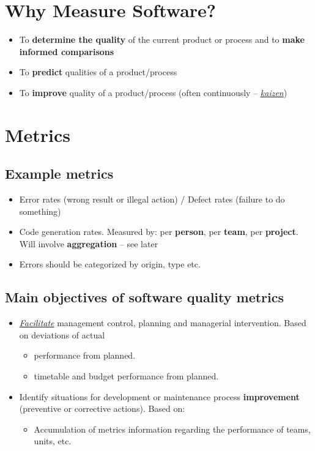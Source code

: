 \documentclass{article}
\newcommand{\worddef}[1]{\hyperref[sec:reference]{\textit{#1}}}
\begin{document}
\tableofcontents

\newpage

\section{Why Measure Software?}

\begin{itemize}
  \item To \textbf{determine the quality} of the current product or process and to \textbf{make informed comparisons}
  \item To \textbf{predict} qualities of a product/process
  \item To \textbf{improve} quality of a product/process (often continuously – \worddef{kaizen})
\end{itemize}

\section{Metrics}

\subsection{Example metrics}
\begin{itemize}
  \item Error rates (wrong result or illegal action) / Defect rates (failure to do something) 
  \item Code generation rates. Measured by: per \textbf{person}, per \textbf{team}, per \textbf{project}. Will involve \textbf{aggregation} – see later
  \item Errors should be categorized by origin, type etc.
\end{itemize}

\subsection{Main objectives of software quality metrics}

\begin{itemize}
  \item \worddef{Facilitate} management control, planning and managerial intervention. Based on deviations of actual 
  \begin{itemize}
    \item performance from planned.
    \item timetable and budget performance from planned. 
  \end{itemize}
  \item Identify situations for development or maintenance process \textbf{improvement} (preventive or corrective actions). Based on:
  \begin{itemize}
    \item Accumulation of metrics information regarding the performance of teams, units, etc.
  \end{itemize}
\end{itemize}
\end{document}
